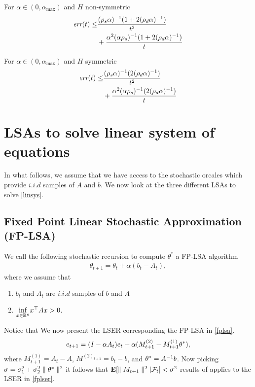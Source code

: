 \begin{lemma}\label{nonsym}
For $\alpha\in(0,\alpha_{\max})$ and $H$ non-symmetric
\begin{align}
\emph{err}(t)\leq &\frac{(\rho_s\alpha)^{-1}(1+2(\rho_d\alpha)^{-1})}{t^2}\nonumber\\&+\frac{\alpha^2(\alpha\rho_s)^{-1}(1+2(\rho_d\alpha)^{-1})}{t}
\end{align}
\end{lemma}
\begin{lemma}\label{sym}
For $\alpha\in(0,\alpha_{\max})$ and $H$ symmetric
\begin{align}
\emph{err}(t)\leq &\frac{(\rho_s\alpha)^{-1}(2(\rho_d\alpha)^{-1})}{t^2}\nonumber\\&+\frac{\alpha^2(\alpha\rho_s)^{-1}(2(\rho_d\alpha)^{-1})}{t}
\end{align}
\end{lemma}
\section{LSAs to solve linear system of equations}
In what follows, we assume that we have access to the stochastic orcales which provide $i.i.d$ samples of $A$ and $b$. We now look at the three different LSAs to solve \eqref{linsys}.
\subsection{Fixed Point Linear Stochastic Approximation (FP-LSA)}
We call the following stochastic recursion to compute $\theta^*$ a FP-LSA algorithm
\begin{align}\label{fplsa}
\theta_{t+1}=\theta_t+\alpha(b_t-A_t),
\end{align}
where we assume that
\begin{assumption}
\begin{enumerate}[leftmargin=*]
\item $b_t$ and $A_t$ are $i.i.d$ samples of $b$ and $A$
\item \label{pd}$\underset{x\in\mathbb{R}^n}{\inf} x^\top A x>0$.
\end{enumerate}
\end{assumption}
Notice that
We now present the LSER corresponding the FP-LSA in \eqref{fplsa}.
\begin{align}\label{fplser}
e_{t+1}=(I-\alpha A_t)e_t+\alpha(M^{(2)}_{t+1}-M^{(1)}_{t+1}\theta^*),
\end{align}
where $M^{(1)}_{t+1}=A_t-A$, $M^{(2)_{t+1}}=b_t-b$,  and $\theta^*=A^{-1}b$. Now picking $\sigma=\sigma_1^2+\sigma^2_2 \parallel\theta^*\parallel^2$ it follows that $\mathbf{E}[\parallel M_{t+1} \parallel^2|\mathcal{F}_t]<\sigma^2$ results of  applies to the LSER in \eqref{fplser}.
